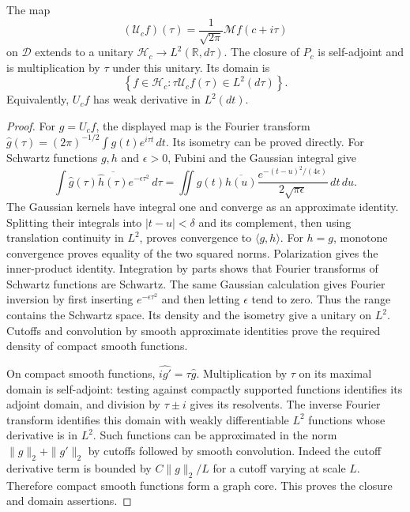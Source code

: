 \begin{lemma}
\label{mo:mellin-unitary}
The map
\[
 (\mathcal U_cf)(\tau)=\frac1{\sqrt{2\pi}}
                          \mathcal Mf(c+i\tau)
\]
on $\mathscr D$ extends to a unitary
$\mathscr H_c\to L^2(\mathbb R,d\tau)$. The closure of $P_c$ is
self-adjoint and is multiplication by $\tau$ under this unitary.
Its domain is
\[
 \left\{f\in\mathscr H_c:
       \tau\mathcal U_cf(\tau)\in L^2(d\tau)\right\}.
\]
Equivalently, $U_cf$ has weak derivative in $L^2(dt)$.
\end{lemma}
\begin{proof}
For $g=U_cf$, the displayed map is the Fourier transform
$\widehat g(\tau)=(2\pi)^{-1/2}\int g(t)e^{i\tau t}\,dt$.
Its isometry can be proved directly. For Schwartz functions
$g,h$ and $\epsilon>0$, Fubini and the Gaussian integral give
\[
 \int\widehat g(\tau)\overline{\widehat h(\tau)}
                      e^{-\epsilon\tau^2}\,d\tau
 =\iint g(t)\overline{h(u)}
 \frac{e^{-(t-u)^2/(4\epsilon)}}{2\sqrt{\pi\epsilon}}\,dt\,du.
\]
The Gaussian kernels have integral one and converge as an
approximate identity. Splitting their integrals into
$|t-u|<\delta$ and its complement, then using translation
continuity in $L^2$, proves convergence to $\langle g,h\rangle$.
For $h=g$, monotone convergence proves equality of the two squared
norms. Polarization gives the inner-product identity.
Integration by parts shows that Fourier transforms of Schwartz
functions are Schwartz. The same Gaussian calculation gives
Fourier inversion by first inserting $e^{-\epsilon\tau^2}$ and
then letting $\epsilon$ tend to zero. Thus the range contains the
Schwartz space. Its density and the isometry give a unitary on
$L^2$. Cutoffs and convolution by smooth approximate identities
prove the required density of compact smooth functions.

On compact smooth functions, $\widehat{ig'}=\tau\widehat g$.
Multiplication by $\tau$ on its maximal domain is self-adjoint:
testing against compactly supported functions identifies its
adjoint domain, and division by $\tau\pm i$ gives its resolvents.
The inverse Fourier transform identifies this domain with weakly
differentiable $L^2$ functions whose derivative is in $L^2$.
Such functions can be approximated in the norm
$\|g\|_2+\|g'\|_2$ by cutoffs followed by smooth convolution.
Indeed the cutoff derivative term is bounded by
$C\|g\|_2/L$ for a cutoff varying at scale $L$.
Therefore compact smooth functions form a graph core. This proves
the closure and domain assertions.
\end{proof}

